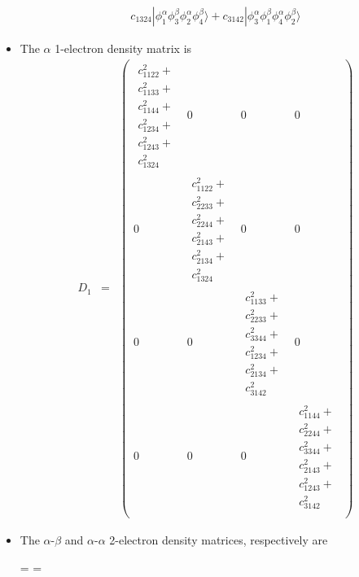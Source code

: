 \documentclass[aip,graphicx]{revtex4-1}
\begin{document}
\begin{itemize}
\begin{eqnarray}
                        c_{1324}|\phi_1^\alpha\phi_3^\beta\phi_2^\alpha\phi_4^\beta\rangle +
                        c_{3142}|\phi_3^\alpha\phi_1^\beta\phi_4^\alpha\phi_2^\beta\rangle
         \end{eqnarray}
\item The $\alpha$ 1-electron density matrix is
         \begin{eqnarray}
         D_1 &=&
         \begin{pmatrix}
         \begin{array}{l}
         c_{1122}^2+ \\
         c_{1133}^2+ \\
         c_{1144}^2+ \\
         c_{1234}^2+ \\
         c_{1243}^2+ \\
         c_{1324}^2 
         \end{array}
         & 0 & 0 & 0 \\
         0 & 
         \begin{array}{l}
         c_{1122}^2+ \\
         c_{2233}^2+ \\
         c_{2244}^2+ \\
         c_{2143}^2+ \\
         c_{2134}^2+ \\
         c_{1324}^2
         \end{array}
         & 0 & 0 \\
         0 & 0 &
         \begin{array}{l}
         c_{1133}^2+ \\
         c_{2233}^2+ \\
         c_{3344}^2+ \\
         c_{1234}^2+ \\
         c_{2134}^2+ \\
         c_{3142}^2
         \end{array}
         & 0 \\
         0 & 0 & 0 &
         \begin{array}{l}
         c_{1144}^2+ \\
         c_{2244}^2+ \\
         c_{3344}^2+ \\
         c_{2143}^2+ \\
         c_{1243}^2+ \\
         c_{3142}^2
         \end{array} \\
         \end{pmatrix}
         \end{eqnarray}
\item The $\alpha$-$\beta$ and $\alpha$-$\alpha$ 2-electron density matrices, respectively are
         \eject
         \pdfpagewidth=16.5in
         \pdfpageheight=11.7in
         \tiny
         
         
         \normalsize
         \eject
         \pdfpagewidth=\classpagewidth
         \pdfpageheight=\classpageheight
\end{itemize}
\end{document}
